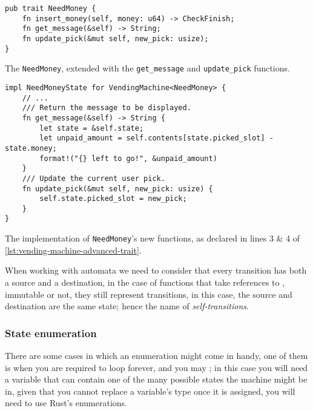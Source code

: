\begin{listing}
    \begin{verbatim}
pub trait NeedMoney {
    fn insert_money(self, money: u64) -> CheckFinish;
    fn get_message(&self) -> String;
    fn update_pick(&mut self, new_pick: usize);
}
    \end{verbatim}
    \caption{The \texttt{NeedMoney}, extended with the \texttt{get\_message} and \texttt{update\_pick} functions.}
    \label{lst:vending-machine-advanced-trait}
\end{listing}

\begin{listing}
    \begin{verbatim}
impl NeedMoneyState for VendingMachine<NeedMoney> {
    // ...
    /// Return the message to be displayed.
    fn get_message(&self) -> String {
        let state = &self.state;
        let unpaid_amount = self.contents[state.picked_slot] - state.money;
        format!("{} left to go!", &unpaid_amount)
    }
    /// Update the current user pick.
    fn update_pick(&mut self, new_pick: usize) {
        self.state.picked_slot = new_pick;
    }
}
    \end{verbatim}
    \caption{The implementation of \texttt{NeedMoney}'s new functions, as declared in lines 3 \& 4 of \autoref{lst:vending-machine-advanced-trait}.}
    \label{lst:vending-machine-advanced-trait-impl}
\end{listing}

When working with automata we need to consider that every transition has both a source and a destination,
in the case of functions that take references to , immutable or not,
they still represent transitions, in this case, the source and destination are the same state;
hence the name of \emph{self-transitions}.

\subsubsection{State enumeration}

There are some cases in which an enumeration might come in handy,
one of them is when you are required to loop forever,
and you may  ;
in this case you will need a variable that can contain one of the many possible states the machine might be in,
given that you cannot replace a variable's type once it is assigned, you will need to use Rust's enumerations.

